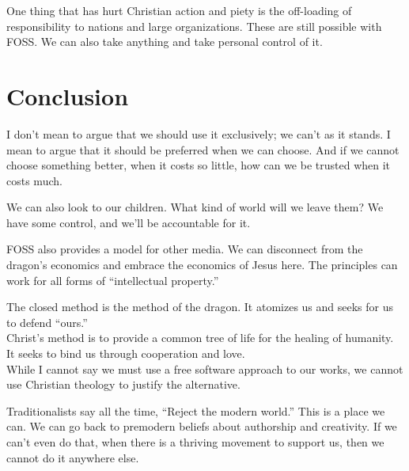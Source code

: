 \documentclass{beamer}
\begin{document}
\begin{frame}
  One thing that has hurt Christian action and piety is the off-loading of responsibility to nations and large organizations.
  These are still possible with FOSS.
  We can also take anything and take personal control of it.
\end{frame}

\section{Conclusion}

\begin{frame}
  I don't mean to argue that we should use it exclusively; we can't as it stands.
  I mean to argue that it should be preferred when we can choose.
  And if we cannot choose something better, when it costs so little, how can we be trusted when it costs much.
\end{frame}

\begin{frame}
  We can also look to our children.
  What kind of world will we leave them?
  We have some control, and we'll be accountable for it.
\end{frame}

\begin{frame}
  FOSS also provides a model for other media.
  We can disconnect from the dragon's economics and embrace the economics of Jesus here.
  The principles can work for all forms of ``intellectual property.''
\end{frame}

\begin{frame}
  The closed method is the method of the dragon.
  It atomizes us and seeks for us to defend ``ours.''\\ \pause
  Christ's method is to provide a common tree of life for the healing of humanity.
  It seeks to bind us through cooperation and love.\\ \pause
  While I cannot say we must use a free software approach to our works, we cannot use Christian theology to justify the alternative.
\end{frame}

\begin{frame}
  Traditionalists say all the time, ``Reject the modern world.''
  This is a place we can.
  We can go back to premodern beliefs about authorship and creativity.
  If we can't even do that, when there is a thriving movement to support us, then we cannot do it anywhere else.
\end{frame}
\end{document}
